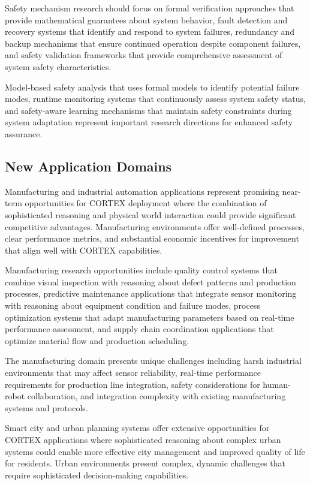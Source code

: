 Safety mechanism research should focus on formal verification approaches that provide mathematical guarantees about system behavior, fault detection and recovery systems that identify and respond to system failures, redundancy and backup mechanisms that ensure continued operation despite component failures, and safety validation frameworks that provide comprehensive assessment of system safety characteristics.

Model-based safety analysis that uses formal models to identify potential failure modes, runtime monitoring systems that continuously assess system safety status, and safety-aware learning mechanisms that maintain safety constraints during system adaptation represent important research directions for enhanced safety assurance.

\subsection{New Application Domains}

Manufacturing and industrial automation applications represent promising near-term opportunities for CORTEX deployment where the combination of sophisticated reasoning and physical world interaction could provide significant competitive advantages. Manufacturing environments offer well-defined processes, clear performance metrics, and substantial economic incentives for improvement that align well with CORTEX capabilities.

Manufacturing research opportunities include quality control systems that combine visual inspection with reasoning about defect patterns and production processes, predictive maintenance applications that integrate sensor monitoring with reasoning about equipment condition and failure modes, process optimization systems that adapt manufacturing parameters based on real-time performance assessment, and supply chain coordination applications that optimize material flow and production scheduling.

The manufacturing domain presents unique challenges including harsh industrial environments that may affect sensor reliability, real-time performance requirements for production line integration, safety considerations for human-robot collaboration, and integration complexity with existing manufacturing systems and protocols.

Smart city and urban planning systems offer extensive opportunities for CORTEX applications where sophisticated reasoning about complex urban systems could enable more effective city management and improved quality of life for residents. Urban environments present complex, dynamic challenges that require sophisticated decision-making capabilities.

